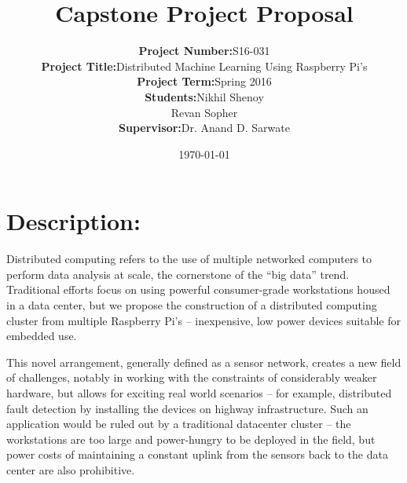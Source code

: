 \documentclass[12pt]{report}
\begin{document}
\title{Capstone Project Proposal}

\author{\begin{tabular}{rl}
	\textbf{Project Number:} & S16-031 \\
	\textbf{Project Title:} & Distributed Machine Learning Using Raspberry Pi’s \\
	\textbf{Project Term:} & Spring 2016 \\
	\textbf{Students:} & Nikhil Shenoy \\ & Revan Sopher \\
	\textbf{Supervisor:} & Dr. Anand D. Sarwate \\
\end{tabular}}

\date{\today}
\maketitle

\newpage

\section*{Description:}

Distributed computing refers to the use of multiple networked computers to perform data analysis at scale, the cornerstone of the “big data” trend. Traditional efforts focus on using powerful consumer-grade workstations housed in a data center, but we propose the construction of a distributed computing cluster from multiple Raspberry Pi’s -- inexpensive, low power devices suitable for embedded use.

This novel arrangement, generally defined as a sensor network, creates a new field of challenges, notably in working with the constraints of considerably weaker hardware, but allows for exciting real world scenarios -- for example, distributed fault detection by installing the devices on highway infrastructure. Such an application would be ruled out by a traditional datacenter cluster -- the workstations are too large and power-hungry to be deployed in the field, but power costs of maintaining a constant uplink from the sensors back to the data center are also prohibitive.
\end{document}
